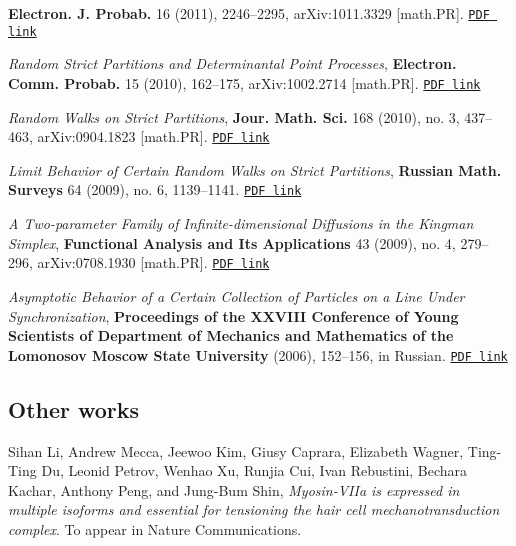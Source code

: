 \documentclass[letterpaper,11pt]{article}
\begin{document}
\begin{etaremune}
			\textbf{Electron. J. Probab.} 16 (2011), 2246--2295,
	      arXiv:1011.3329 [math.PR].
		\href{https://storage.lpetrov.cc/research_files/Petrov-publ/06-publ-petrov.pdf}{\texttt{PDF link}}
	\item
	      \emph{Random Strict Partitions and Determinantal Point
		      Processes},
					\textbf{Electron. Comm. Probab.} 15 (2010), 162--175,
	      arXiv:1002.2714 [math.PR].
		\href{https://storage.lpetrov.cc/research_files/Petrov-publ/05-publ-petrov.pdf}{\texttt{PDF link}}
	\item
	      \emph{Random Walks on Strict Partitions}, 
				\textbf{Jour. Math. Sci.}
				168 (2010), no. 3, 437--463,
	      arXiv:0904.1823 [math.PR].
		\href{https://storage.lpetrov.cc/research_files/Petrov-publ/04-publ-petrov.pdf}{\texttt{PDF link}}
	\item
	      \emph{Limit Behavior of Certain Random Walks on Strict
		      Partitions},
					\textbf{Russian Math. Surveys} 64 (2009), no. 6, 1139--1141.
		\href{https://storage.lpetrov.cc/research_files/Petrov-publ/03-publ-petrov.pdf}{\texttt{PDF link}}
	\item
	      \emph{A Two-parameter Family of Infinite-dimensional Diffusions
		      in the Kingman Simplex}, \textbf{Functional Analysis and Its
					Applications} 43 (2009), no. 4, 279--296, arXiv:0708.1930
	      [math.PR].
		\href{https://storage.lpetrov.cc/research_files/Petrov-publ/02-publ-petrov.pdf}{\texttt{PDF link}}
	\item
	      \emph{Asymptotic Behavior of a Certain Collection of Particles
		      on a Line Under Synchronization}, \textbf{Proceedings of the XXVIII
	      Conference of Young Scientists of Department of Mechanics and
			Mathematics of the Lomonosov Moscow State University} (2006), 152--156, in
	      Russian.
		\href{https://storage.lpetrov.cc/research_files/Petrov-publ/01-publ-petrov-russian.pdf}{\texttt{PDF link}}
\end{etaremune}

\subsection*{Other works}

\begin{etaremune}
	\renewcommand{\labelenumi}{[\theenumi]}
	\item
	Sihan Li, Andrew Mecca, Jeewoo Kim, Giusy Caprara, Elizabeth Wagner, Ting-Ting Du, Leonid Petrov, Wenhao Xu, Runjia Cui, Ivan Rebustini, Bechara Kachar, Anthony Peng, and Jung-Bum Shin,
	\emph{Myosin-VIIa is expressed in multiple isoforms and essential for tensioning the hair cell mechanotransduction complex}.
	To appear in Nature Communications.
\end{etaremune}
\end{document}
